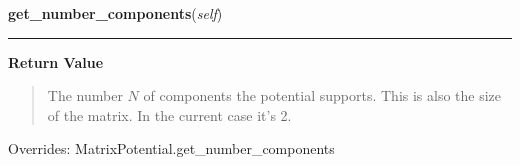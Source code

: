 \hspace{.8\funcindent}\begin{boxedminipage}{\funcwidth}

    \raggedright \textbf{get\_number\_components}(\textit{self})

    \vspace{-1.5ex}

    \rule{\textwidth}{0.5\fboxrule}
\setlength{\parskip}{2ex}
\setlength{\parskip}{1ex}
      \textbf{Return Value}
    \vspace{-1ex}

      \begin{quote}
      The number $N$ of components the potential supports. This is also
      the size of the matrix. In the current case it's 2.

      \end{quote}



      Overrides: MatrixPotential.get\_number\_components

    \end{boxedminipage}

    \vspace{0.5ex}

